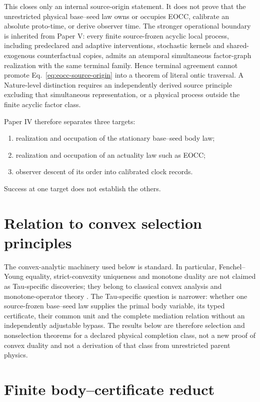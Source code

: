 \documentclass[11pt]{article}
\begin{document}
This closes only an internal source-origin statement.  It does not prove that
the unrestricted physical base--seed law owns or occupies EOCC, calibrate an
absolute proto-time, or derive observer time.  The stronger operational
boundary is inherited from Paper V: every finite source-frozen acyclic local
process, including predeclared and adaptive interventions, stochastic kernels
and shared-exogenous counterfactual copies, admits an atemporal simultaneous
factor-graph realization with the same terminal family.  Hence terminal
agreement cannot promote Eq.~\eqref{eq:eocc-source-origin} into a theorem of
literal ontic traversal.  A Nature-level distinction requires an independently
derived source principle excluding that simultaneous representation, or a
physical process outside the finite acyclic factor class.

Paper IV therefore separates three targets:
\begin{enumerate}[label=(T\arabic*)]
 \item realization and occupation of the stationary base--seed body law;
 \item realization and occupation of an actuality law such as EOCC;
 \item observer descent of its order into calibrated clock records.
\end{enumerate}
Success at one target does not establish the others.

\section{Relation to convex selection principles}

The convex-analytic machinery used below is standard. In particular,
Fenchel--Young equality, strict-convexity uniqueness and monotone duality are
not claimed as Tau-specific discoveries; they belong to classical convex
analysis and monotone-operator theory \cite{Rockafellar1970,BauschkeCombettes2017}.
The Tau-specific question is narrower: whether one source-frozen base--seed
law supplies the primal body variable, its typed certificate, their common
unit and the complete mediation relation without an independently adjustable
bypass. The results below are therefore selection and nonselection theorems
for a declared physical completion class, not a new proof of convex duality
and not a derivation of that class from unrestricted parent physics.

\section{Finite body--certificate reduct}
\end{document}
